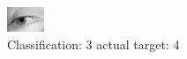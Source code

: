 \begin{figure}[h!]
\begin{center}
\includegraphics[width=0.60\columnwidth]{figures/ID3024_class_3_target_4.png}
\end{center}
\caption{ Classification: 3 actual target: 4}
\label{fig:ID3024_class_3_target_4}
\end{figure}
